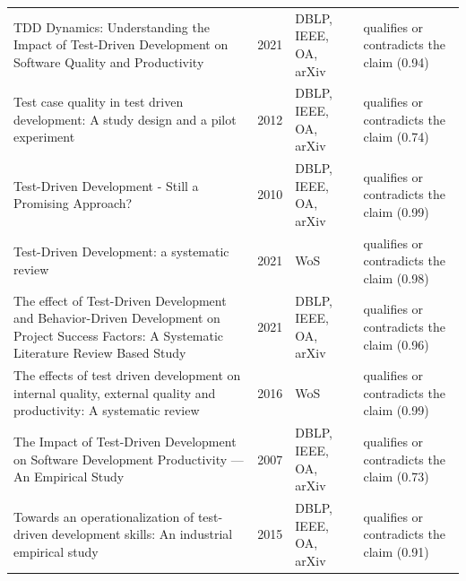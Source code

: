 \begin{longtable}{@{}%
  >{\raggedright\arraybackslash}p{}c%
  >{\raggedright\arraybackslash}p{}%
  >{\raggedright\arraybackslash}p{}@{}}
TDD Dynamics: Understanding the Impact of Test-Driven Development on Software Quality and Productivity & 2021 & DBLP, IEEE, OA, arXiv & qualifies or contradicts the claim (0.94) \\
Test case quality in test driven development: A study design and a pilot experiment & 2012 & DBLP, IEEE, OA, arXiv & qualifies or contradicts the claim (0.74) \\
Test-Driven Development - Still a Promising Approach? & 2010 & DBLP, IEEE, OA, arXiv & qualifies or contradicts the claim (0.99) \\
Test-Driven Development: a systematic review & 2021 & WoS & qualifies or contradicts the claim (0.98) \\
The effect of Test-Driven Development and Behavior-Driven Development on Project Success Factors: A Systematic Literature Review Based Study & 2021 & DBLP, IEEE, OA, arXiv & qualifies or contradicts the claim (0.96) \\
The effects of test driven development on internal quality, external quality and productivity: A systematic review & 2016 & WoS & qualifies or contradicts the claim (0.99) \\
The Impact of Test-Driven Development on Software Development Productivity --- An Empirical Study & 2007 & DBLP, IEEE, OA, arXiv & qualifies or contradicts the claim (0.73) \\
Towards an operationalization of test-driven development skills: An industrial empirical study & 2015 & DBLP, IEEE, OA, arXiv & qualifies or contradicts the claim (0.91) \\
\end{longtable}
\endgroup
